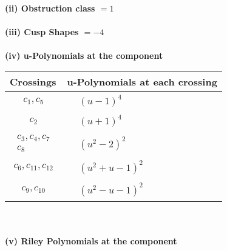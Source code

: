 \documentclass[1p]{elsarticle_modified}
\theoremstyle{definition}
\begin{document}
\flushleft \textbf{(ii) Obstruction class $= 1$}\\~\\
\flushleft \textbf{(iii) Cusp Shapes $= -4$}\\~\\
\newpage\renewcommand{\arraystretch}{1}
\flushleft \textbf{(iv) u-Polynomials at the component}\newline \\
\begin{tabular}{m{50pt}|m{274pt}}
Crossings & \hspace{64pt}u-Polynomials at each crossing \\
\hline $$\begin{aligned}c_{1},c_{5}\end{aligned}$$&$\begin{aligned}
&(u-1)^4
\end{aligned}$\\
\hline $$\begin{aligned}c_{2}\end{aligned}$$&$\begin{aligned}
&(u+1)^4
\end{aligned}$\\
\hline $$\begin{aligned}c_{3},c_{4},c_{7}\\c_{8}\end{aligned}$$&$\begin{aligned}
&(u^2-2)^2
\end{aligned}$\\
\hline $$\begin{aligned}c_{6},c_{11},c_{12}\end{aligned}$$&$\begin{aligned}
&(u^2+u-1)^2
\end{aligned}$\\
\hline $$\begin{aligned}c_{9},c_{10}\end{aligned}$$&$\begin{aligned}
&(u^2- u-1)^2
\end{aligned}$\\
\hline
\end{tabular}\\~\\
\newpage\renewcommand{\arraystretch}{1}
\flushleft \textbf{(v) Riley Polynomials at the component}\newline \\
\end{document}
